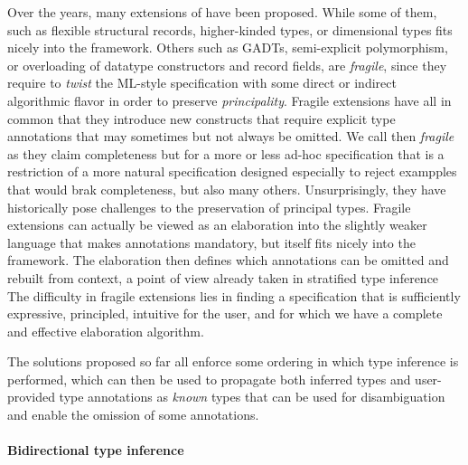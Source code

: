 \documentclass[acmsmall,screen,nonacm]{acmart}
\begin{document}
Over the years, many extensions of \ML have been proposed.  While some of
them, such as flexible structural records, higher-kinded types, or dimensional types fits nicely
into the \ML framework. Others such as GADTs, semi-explicit polymorphism, or
overloading of datatype constructors and record fields, are 
\emph{fragile}, since they require to \emph{twist} the ML-style
specification with some direct or indirect algorithmic flavor in order to
preserve \emph{principality}.  Fragile extensions have all in common that
they introduce new constructs that require explicit type annotations that
may sometimes but not always be omitted. We call then \emph{fragile} as they
claim completeness but for a more or less ad-hoc specification that is a
restriction of a more natural specification designed especially to reject
exampples that would brak completeness, but also many others.
Unsurprisingly, they have historically pose challenges to the preservation
of principal types.  Fragile extensions can actually be viewed as an
elaboration into the slightly weaker language that makes annotations
mandatory, but itself fits nicely into the
\ML framework. The elaboration then defines which annotations can be omitted
and rebuilt from context, a point of view already taken in stratified type
inference~\cite {Pottier-Regis-Gianas/stratified@popl06}
%
The difficulty in fragile extensions lies in finding a specification that is
sufficiently expressive, principled, intuitive for the user, and for which
we have a complete and effective elaboration algorithm.

The solutions proposed so far all enforce some ordering in which type
inference is performed, which can then be used to propagate both inferred
types and user-provided type annotations as \emph{known} types that can be
used for disambiguation and enable the omission of some annotations.

\paragraph{Bidirectional type inference}
\end{document}
